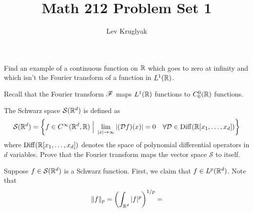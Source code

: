 \documentclass{lkx_pset}
\title{Math 212 Problem Set 1}
\author{Lev Kruglyak}
\begin{document}
\maketitle

\begin{problem}{1}
  Find an example of a continuous function on $\mathbb{R}$ which goes to zero at infinity and which isn't the Fourier transform of a function in $L^1(\mathbb{R})$.
\end{problem}
\begin{solution}
  Recall that the Fourier transform $\mathscr{F}$ maps $L^1(\mathbb{R})$ functions to $C^0_0(\mathbb{R})$ functions.
\end{solution}

\begin{problem}{2}
  The Schwarz space $\mathcal{S}(\mathbb{R}^d)$ is defined as
  \[
    \mathcal{S}(\mathbb{R}^d) = \left\{ f\in C^\infty(\mathbb{R}^d, \mathbb{R}) \;\Big\lvert\; \lim_{|x|\to \infty}|(\mathcal{D} f)(x)|=0\quad\forall \mathcal{D}\in \mathrm{Diff}(\mathbb{R}[x_1,\ldots, x_d])\right\}
  \]
  where $\mathrm{Diff}(\mathbb{R}[x_1,\ldots,x_d])$ denotes the space of polynomial differential operators in $d$ variables. Prove that the Fourier transform maps the vector space $\mathcal{S}$ to itself.
\end{problem}
\begin{solution}
  Suppose $f\in \mathcal{S}(\mathbb{R}^d)$ is a Schwarz function. First, we claim that $f\in L^p(\mathbb{R}^d)$.
  Note that
  \[
    \|f\|_p = \left(\int_{\mathbb{R}^d}|f|^p\right)^{1/p} = 
  \]

\end{solution}
\end{document}
